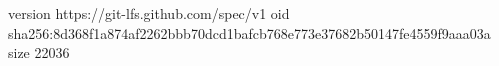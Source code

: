 version https://git-lfs.github.com/spec/v1
oid sha256:8d368f1a874af2262bbb70dcd1bafcb768e773e37682b50147fe4559f9aaa03a
size 22036

